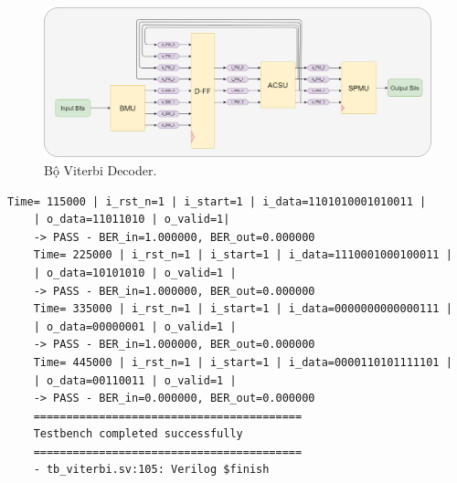 \begin{figure}[H]
	\centering
	\includegraphics[width=.7\linewidth]{sections/pic/mophongbangSystemVerilog/viterbi_decoder.png}
	\caption{Bộ Viterbi Decoder.}
\end{figure}

\begin{lstlisting}[style=StyleResult]
	Time= 115000 | i_rst_n=1 | i_start=1 | i_data=1101010001010011 |
	| o_data=11011010 | o_valid=1| 
	-> PASS - BER_in=1.000000, BER_out=0.000000
	Time= 225000 | i_rst_n=1 | i_start=1 | i_data=1110001000100011 |
	| o_data=10101010 | o_valid=1 |
	-> PASS - BER_in=1.000000, BER_out=0.000000
	Time= 335000 | i_rst_n=1 | i_start=1 | i_data=0000000000000111 | 
	| o_data=00000001 | o_valid=1 | 
	-> PASS - BER_in=1.000000, BER_out=0.000000
	Time= 445000 | i_rst_n=1 | i_start=1 | i_data=0000110101111101 |
	| o_data=00110011 | o_valid=1 |
	-> PASS - BER_in=0.000000, BER_out=0.000000
	=========================================
	Testbench completed successfully
	=========================================
	- tb_viterbi.sv:105: Verilog $finish
	
\end{lstlisting}